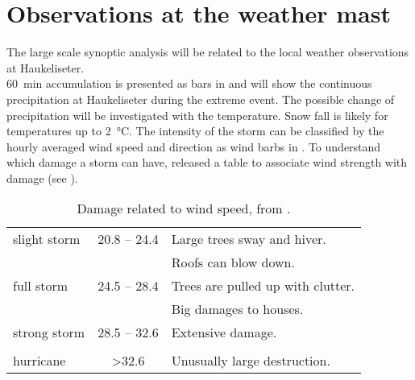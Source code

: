 \section{Observations at the weather mast}
\label{sec:loc_obs}
The large scale synoptic analysis will be related to the local weather  observations at Haukeliseter. 
\\
\SI{60}{\minute} accumulation is presented as bars in  and will show the continuous precipitation at Haukeliseter during the extreme event. The possible change of precipitation will be investigated with the temperature. Snow fall is likely for temperatures up to \SI{2}{\celsius}. The intensity of the storm can be classified by the hourly averaged wind speed and direction as wind barbs in \SI{}{\mPs}.
To understand which damage a storm can have, \cite{faeraas_urd_2016} released a table to associate wind strength with damage (see ).
\begin{table}[t!]
	\begin{center}
		\caption{Damage related to wind speed, from \cite{faeraas_urd_2016}. }\label{tab:wind}
		\begin{tabular}{l|c|l}
			\hline \hline
			slight storm& \SI{20.8}{\mPs} -- \SI{24.4}{\mPs}&  Large trees sway and hiver. \\
			&  &  Roofs can blow down. \\ \hline
			full storm & \SI{24.5}{\mPs} -- \SI{28.4}{\mPs}& Trees are pulled up with clutter. \\
			&  & Big damages to houses.\\ \hline
			strong storm & \SI{28.5}{\mPs} -- \SI{32.6}{\mPs}& Extensive damage.\\
			&  & \\ \hline
			hurricane & \textgreater \SI{32.6}{\mPs}& Unusually large destruction.\\
			\hline
		\end{tabular}
	\end{center}
\end{table}

\newpage

